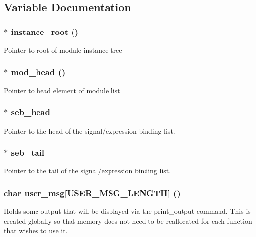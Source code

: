 \subsection{Variable Documentation}
\subsubsection{$\ast$ {\bf instance\_\-root} ()}\label{binding_8c_a0}


Pointer to root of module instance tree 
\subsubsection{$\ast$ {\bf mod\_\-head} ()}\label{binding_8c_a1}


Pointer to head element of module list 
\subsubsection{$\ast$ {\bf seb\_\-head}}\label{binding_8c_a3}


Pointer to the head of the signal/expression binding list. 
\subsubsection{$\ast$ {\bf seb\_\-tail}}\label{binding_8c_a4}


Pointer to the tail of the signal/expression binding list. 
\subsubsection{\setlength{\rightskip}{0pt plus 5cm}char {\bf user\_\-msg}[USER\_\-MSG\_\-LENGTH] ()}\label{binding_8c_a2}


Holds some output that will be displayed via the print\_\-output command. This is created globally so that memory does not need to be reallocated for each function that wishes to use it. 